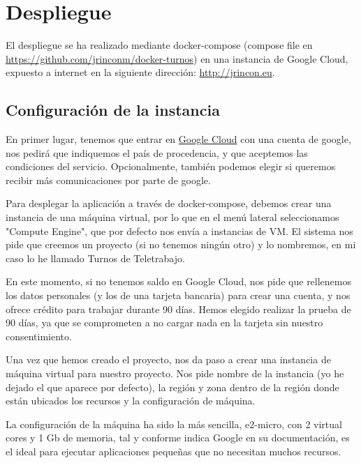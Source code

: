 \documentclass[11pt,spanish,listoffigures,listoftables]{tfgetsinf}
\begin{document}
\chapter{Despliegue}

El despliegue se ha realizado mediante docker-compose (compose file en \url{https://github.com/jrinconm/docker-turnos}) en una instancia de Google Cloud, expuesto a internet en la siguiente dirección:
\url{http://jrincon.eu}.

\section{Configuración de la instancia}
En primer lugar, tenemos que entrar en \href{https://console.cloud.google.com/}{Google Cloud} con una cuenta de google, nos pedirá que indiquemos el país de procedencia, y que aceptemos las condiciones del servicio.
Opcionalmente, también podemos elegir si queremos recibir más comunicaciones por parte de google.

Para desplegar la aplicación a través de docker-compose, debemos crear una instancia de una máquina virtual, por lo que en el menú lateral seleccionamos "Compute Engine", que por defecto nos envía a instancias de VM.
El sistema nos pide que creemos un proyecto (si no tenemos ningún otro) y lo nombremos, en mi caso lo he llamado Turnos de Teletrabajo.

En este momento, si no tenemos saldo en Google Cloud, nos pide que rellenemos los datos personales (y los de una tarjeta bancaria) para crear una cuenta, y nos ofrece crédito para trabajar durante 90 días. 
Hemos elegido realizar la prueba de 90 días, ya que se comprometen a no cargar nada en la tarjeta sin nuestro consentimiento.

Una vez que hemos creado el proyecto, nos da paso a crear una instancia de máquina virtual para nuestro proyecto. 
Nos pide nombre de la instancia (yo he dejado el que aparece por defecto), la región y zona dentro de la región donde están ubicados los recursos y la configuración de máquina.

La configuración de la máquina ha sido la más sencilla, e2-micro, con 2 virtual cores y 1 Gb de memoria, tal y conforme indica Google en su documentación, es el ideal para ejecutar aplicaciones pequeñas que no necesitan muchos recursos.
\end{document}
